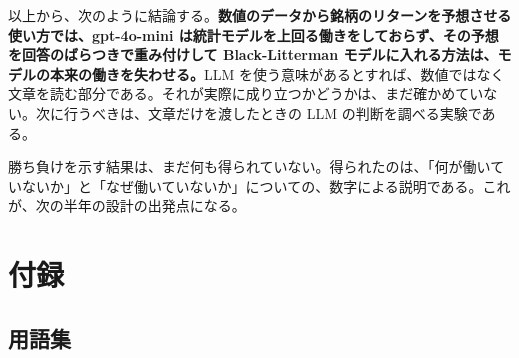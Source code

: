 \documentclass[xelatex,ja=standard,jafont=hiragino-pron,a4paper,10pt]{bxjsreport}
\begin{document}
以上から、次のように結論する。\textbf{数値のデータから銘柄のリターンを予想させる使い方では、gpt-4o-mini は統計モデルを上回る働きをしておらず、その予想を回答のばらつきで重み付けして Black-Litterman モデルに入れる方法は、モデルの本来の働きを失わせる。}LLM を使う意味があるとすれば、数値ではなく文章を読む部分である。それが実際に成り立つかどうかは、まだ確かめていない。次に行うべきは、文章だけを渡したときの LLM の判断を調べる実験である。

勝ち負けを示す結果は、まだ何も得られていない。得られたのは、「何が働いていないか」と「なぜ働いていないか」についての、数字による説明である。これが、次の半年の設計の出発点になる。

\appendix
\part{付録}

\chapter{用語集}\label{app:glossary}
\end{document}
